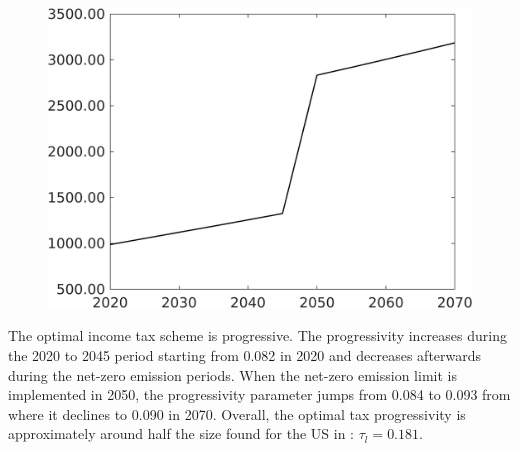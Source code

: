\begin{figure}[h!!]
\begin{minipage}[]{0.32\textwidth}
		\includegraphics[width=1\textwidth]{../../codding_model/own_basedOnFried/optimalPol_010922_revision/figures/all_13Sept22_Tplus30/Single_OPT_T_NoTaus_Tauf_regime4_spillover0_knspil0_noskill0_sep0_xgrowth0_extern0_PV1_sizeequ0_GOV0_etaa0.79.png}
	\end{minipage}
\end{figure} 

The optimal income tax scheme is progressive. The progressivity  increases during the 2020 to 2045 period starting from 0.082 in 2020  and decreases afterwards during the net-zero emission periods.  When the net-zero emission limit is implemented in 2050, the progressivity parameter jumps from 0.084 to 0.093 from where it  declines to 0.090 in 2070.
Overall, the optimal tax progressivity is approximately  around half the size found for the US in \cite{Heathcote2017OptimalFramework}: $\tau_{l}=0.181$.

